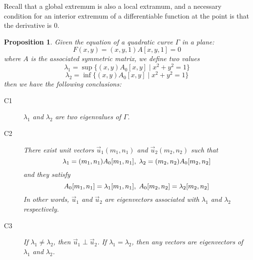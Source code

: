 \documentclass[onecolumn]{ctexart}
\newtheorem{proposition}{Proposition}
\begin{document}
Recall that a global extremum is also a local extramum, and a necessary condition 
for an interior extremum of a differentiable function at the point is that the 
derivative is $0$.

\begin{proposition}
  Given the equation of a quadratic curve $\varGamma$ in a plane:
  \[
    F(x, y) = (x, y, 1)A[x, y, 1] = 0
  \]
  where $A$ is the associated symmetric matrix, we define two values
  \begin{equation}
    \lambda_1 = \sup \lbrace (x,y)A_0[x,y] \mid x^2 + y^2 = 1 \rbrace
  \end{equation}
  \begin{equation}
    \lambda_2 = \inf \lbrace (x,y)A_0[x,y] \mid x^2 + y^2 = 1 \rbrace
  \end{equation}
  then we have the following conclusions:
  \begin{description}
    \item[C1] $\lambda_1$ and $\lambda_2$ are two eigenvalues of $\varGamma$.
    \item[C2] There exist unit vectors $\vec{u}_1(m_1, n_1)$ and $\vec{u}_2(m_2, 
    n_2)$ such that 
    \[
      \lambda_1 = (m_1, n_1)A_0[m_1, n_1],\thickspace \lambda_2 = (m_2, n_2)A_0[m_2, n_2] 
    \]
    and they satisfy
    \[
      A_0[m_1, n_1] = \lambda_1[m_1, n_1],\thickspace A_0[m_2, n_2] = \lambda_2[m_2, n_2]
    \]
    In other words, $\vec{u}_1$ and $\vec{u}_2$ are eigenvectors associated with 
    $\lambda_1$ and $\lambda_2$ respectively.
    \item[C3] If $\lambda_1 \neq \lambda_2$, then $\vec{u}_1 \perp \vec{u}_2$. If 
    $\lambda_1 = \lambda_2$, then any vectors are eigenvectors of $\lambda_1$ and 
    $\lambda_2$.
  \end{description}
\end{proposition}
\end{document}
